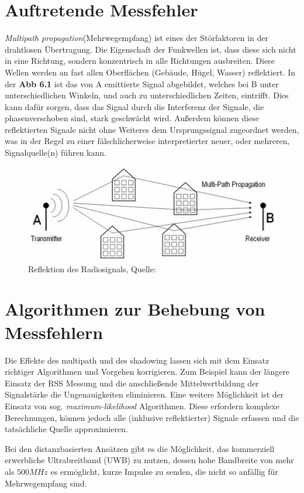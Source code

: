 \documentclass[12pt, a4wide]{scrreprt}
\begin{document}
  \section{Auftretende Messfehler}
\textit{Multipath propagation}(Mehrwegempfang) ist eines der Störfaktoren in der drahtlosen Übertragung. Die Eigenschaft der Funkwellen ist, dass diese sich nicht in eine Richtung, sondern konzentrisch in alle Richtungen ausbreiten. Diese Wellen werden an fast allen Oberflächen (Gebäude, Hügel, Wasser) reflektiert. In der {\bf Abb 6.1} ist das von A emittierte Signal abgebildet, welches bei B unter unterschiedlichen Winkeln, und auch zu unterschiedlichen Zeiten, eintrifft. Dies kann dafür sorgen, dass das Signal durch die Interferenz der Signale, die phasenverschoben sind, stark geschwächt wird. Außerdem können diese reflektierten Signale nicht ohne Weiteres dem Ursprungssignal zugeordnet werden, was in der Regel zu einer fälschlicherweise interpretierter neuer, oder mehreren, Signalquelle(n) führen kann.

\begin{figure}[!htb]
\centering
\includegraphics[scale=1]{multipath.png}
\caption{Reflektion des Radiosignals, Quelle:\cite{multipath}}
\end{figure}

  \section{Algorithmen zur Behebung von Messfehlern}
Die Effekte des multipath und des shadowing lassen sich mit dem Einsatz richtiger Algorithmen und Vorgehen korrigieren. Zum Beispiel kann der längere Einsatz der RSS Messung und die anschließende Mittelwertbildung der Signalstärke die Ungenauigkeiten eliminieren\cite{gezici2008survey}. Eine weitere Möglichkeit ist der Einsatz von sog. \textit{maximum-likelihood} Algorithmen\cite{q1}. Diese erfordern komplexe Berechnungen, können jedoch alle (inklusive reflektierter) Signale erfassen und die tatsächliche Quelle approximieren.

Bei den distanzbasierten Ansätzen gibt es die Möglichkeit, das kommerziell erwerbliche Ultrabreitband (UWB) zu nutzen\cite{q1}, dessen hohe Bandbreite von mehr als $500MHz$ es ermöglicht, kurze Impulse zu senden, die nicht so anfällig für Mehrwegempfang sind.
\end{document}
